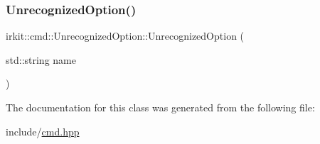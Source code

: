 \subsubsection{\texorpdfstring{Unrecognized\+Option()}{UnrecognizedOption()}}
{\footnotesize\ttfamily irkit\+::cmd\+::\+Unrecognized\+Option\+::\+Unrecognized\+Option (\begin{DoxyParamCaption}\item[{std\+::string}]{name }\end{DoxyParamCaption})\hspace{0.3cm}{\ttfamily [inline]}}



The documentation for this class was generated from the following file\+:\begin{DoxyCompactItemize}
\item 
include/\mbox{\hyperlink{cmd_8hpp}{cmd.\+hpp}}\end{DoxyCompactItemize}
